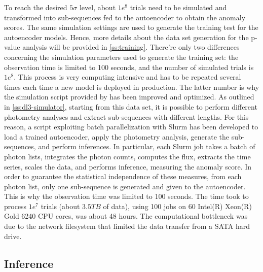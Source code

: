 To reach the desired $5\sigma$ level, about $1e^8$ trials need to be simulated and transformed into sub-sequences fed to the autoencoder to obtain the anomaly scores. The same simulation settings are used to generate the training test for the autoencoder models. Hence, more details about the data set generation for the p-value analysis will be provided in \autoref{ss:training}. There're only two differences concerning the simulation parameters used to generate the training set: the observation time is limited to 100 seconds, and the number of simulated trials is $1e^8$. This process is very computing intensive and has to be repeated several times each time a new model is deployed in production. The latter number is why the simulation script provided by \cite{dipiano2022ctasagsci} has been improved and optimized. As outlined in \autoref{ss:dl3-simulator}, starting from this data set, it is possible to perform different photometry analyses and extract sub-sequences with different lengths. For this reason, a script exploiting batch parallelization with Slurm has been developed to load a trained autoencoder, apply the photometry analysis, generate the sub-sequences, and perform inferences. In particular, each Slurm job takes a batch of photon lists, integrates the photon counts, computes the flux, extracts the time series, scales the data, and performs inference, measuring the anomaly score. In order to guarantee the statistical independence of these measures, from each photon list, only one sub-sequence is generated and given to the autoencoder. This is why the observation time was limited to 100 seconds. The time took to process $1e^7$ trials (about $3.5 TB$ of data), using 100 jobs on 60 Intel(R) Xeon(R) Gold 6240 CPU  cores, was about 48 hours. The computational bottleneck was due to the network filesystem that limited the data transfer from a SATA hard drive. 


\subsection{Inference}
\label{ss:inference}



